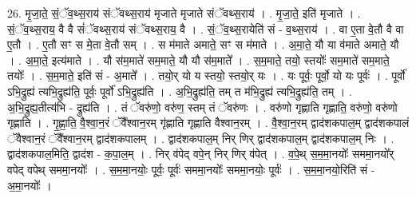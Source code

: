 \documentclass[17pt]{extarticle}
\begin{document}
26. मृ॒जा॒ते॒ सं॒ॅव॒थ्स॒राय॑ संॅवथ्स॒राय॑ मृजाते मृजाते संॅवथ्स॒राय॑ । . मृ॒जा॒ते॒ इति॑ मृजाते । . सं॒ॅव॒थ्स॒राय॒ वै वै सं॑ॅवथ्स॒राय॑ संॅवथ्स॒राय॒ वै । . सं॒ॅव॒थ्स॒रायेति॑ सं - व॒थ्स॒राय॑ । . वा ए॒ता वे॒तौ वै वा ए॒तौ । . ए॒तौ सꣳ स मे॒ता वे॒तौ सम् । . स म॑माते अमाते॒ सꣳ स म॑माते । . अ॒मा॒ते॒ यौ या व॑माते अमाते॒ यौ । . अ॒मा॒ते॒ इत्य॑माते । . यौ स॑म॒माते॑ सम॒माते॒ यौ यौ स॑म॒माते᳚ । . स॒म॒माते॒ तयो॒ स्तयोः᳚ सम॒माते॑ सम॒माते॒ तयोः᳚ । . स॒म॒माते॒ इति॑ सं - अ॒माते᳚ । . तयो॒र् यो य स्तयो॒ स्तयो॒र् यः । . यः पूर्वः॒ पूर्वो॒ यो यः पूर्वः॑ । . पूर्वो॑ ऽभि॒द्रुह्य॑ त्यभि॒द्रुह्य॑ति॒ पूर्वः॒ पूर्वो॑ ऽभि॒द्रुह्य॑ति । . अ॒भि॒द्रुह्य॑ति॒ तम् त म॑भि॒द्रुह्य॑ त्यभि॒द्रुह्य॑ति॒ तम् । . अ॒भि॒द्रुह्य॒तीत्य॑भि - द्रुह्य॑ति । . तं ॅवरु॑णो॒ वरु॑ण॒ स्तम् तं ॅवरु॑णः । . वरु॑णो गृह्णाति गृह्णाति॒ वरु॑णो॒ वरु॑णो गृह्णाति । . गृ॒ह्णा॒ति॒ वै॒श्वा॒न॒रं ॅवै᳚श्वान॒रम् गृ॑ह्णाति गृह्णाति वैश्वान॒रम् । . वै॒श्वा॒न॒रम् द्वाद॑शकपाल॒म् द्वाद॑शकपालं ॅवैश्वान॒रं ॅवै᳚श्वान॒रम् द्वाद॑शकपालम् । . द्वाद॑शकपाल॒म् निर् णिर् द्वाद॑शकपाल॒म् द्वाद॑शकपाल॒म् निः । . द्वाद॑शकपाल॒मिति॒ द्वाद॑श - क॒पा॒ल॒म् । . निर् व॑पेद् वपे॒न् निर् णिर् व॑पेत् । . व॒पे॒थ् स॒म॒मा॒नयोः᳚ सममा॒नयो᳚र् वपेद् वपेथ् सममा॒नयोः᳚ । . स॒म॒मा॒नयोः॒ पूर्वः॒ पूर्वः॑ सममा॒नयोः᳚ सममा॒नयोः॒ पूर्वः॑ । . स॒म॒मा॒नयो॒रिति॑ सं - अ॒मा॒नयोः᳚ । \newline
\end{document}
